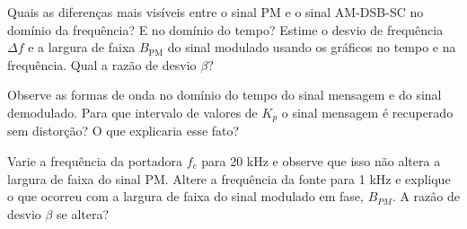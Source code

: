 \documentclass[12pt,addpoints]{exam}
\begin{document}
\begin{questions}
    \question Quais as diferenças mais visíveis entre o sinal PM e o sinal AM-DSB-SC no domínio da frequência? E no domínio do tempo?
    \fillwithlines{1.5in}
    \question Estime o desvio de frequência $\Delta f$ e a largura de faixa $B_{\text{PM}}$ do sinal modulado usando os gráficos no tempo e na frequência. Qual a razão de desvio $\beta$?
    \fillwithlines{0.75in}
    
    \question Observe as formas de onda no domínio do tempo do sinal mensagem e do sinal demodulado. Para que intervalo de valores de $K_p$ o sinal mensagem é recuperado sem distorção? O que explicaria esse fato?
    \fillwithlines{0.50in}

    \question Varie a frequência da portadora $f_c$ para 20 kHz e observe que isso não altera a largura de faixa do sinal PM. Altere a frequência da fonte para 1 kHz e explique o que ocorreu com a largura de faixa do sinal modulado em fase, $B_{PM}$. A razâo de desvio $\beta$ se altera?
    \fillwithlines{0.5in}
    
%    
\end{questions}
\end{document}
